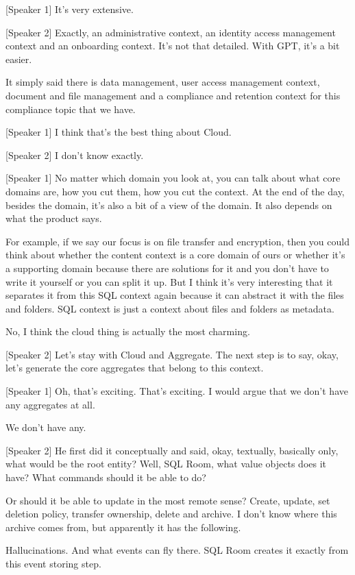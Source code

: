 [Speaker 1]
It's very extensive.

[Speaker 2]
Exactly, an administrative context, an identity access management context and an onboarding context. It's not that detailed. With GPT, it's a bit easier.

It simply said there is data management, user access management context, document and file management and a compliance and retention context for this compliance topic that we have.

[Speaker 1]
I think that's the best thing about Cloud.

[Speaker 2]
I don't know exactly.

[Speaker 1]
No matter which domain you look at, you can talk about what core domains are, how you cut them, how you cut the context. At the end of the day, besides the domain, it's also a bit of a view of the domain. It also depends on what the product says.

For example, if we say our focus is on file transfer and encryption, then you could think about whether the content context is a core domain of ours or whether it's a supporting domain because there are solutions for it and you don't have to write it yourself or you can split it up. But I think it's very interesting that it separates it from this SQL context again because it can abstract it with the files and folders. SQL context is just a context about files and folders as metadata.

No, I think the cloud thing is actually the most charming.

[Speaker 2]
Let's stay with Cloud and Aggregate. The next step is to say, okay, let's generate the core aggregates that belong to this context.

[Speaker 1]
Oh, that's exciting. That's exciting. I would argue that we don't have any aggregates at all.

We don't have any.

[Speaker 2]
He first did it conceptually and said, okay, textually, basically only, what would be the root entity? Well, SQL Room, what value objects does it have? What commands should it be able to do?

Or should it be able to update in the most remote sense? Create, update, set deletion policy, transfer ownership, delete and archive. I don't know where this archive comes from, but apparently it has the following.

Hallucinations. And what events can fly there. SQL Room creates it exactly from this event storing step.

